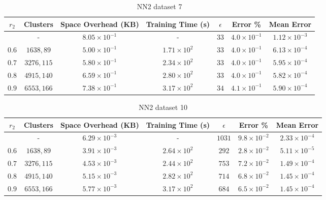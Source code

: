 \begin{adjustwidth}{-1cm}{}
\begin{table}
\caption{NN2 dataset 7}\label{ws27}
\begin{tabular}{ccccccc}
\hline
\toprule
$r_2$ & Clusters & Space Overhead (KB) & Training Time (s) & $\epsilon$ & Error \% & Mean Error\\
\midrule
 & - & $8.05 \times 10^{-1}$ & - & $33$ & $4.0 \times 10^{-1}$ & $1.12 \times 10^{-3}$\\
$0.6$ & $1638, 89$ & $5.00 \times 10^{-1}$ & $1.71 \times 10^2$ & $33$ & $4.0 \times 10^{-1}$ & $6.13 \times 10^{-4}$\\
$0.7$ & $3276, 115$ & $5.80 \times 10^{-1}$ & $2.34 \times 10^2$ & $33$ & $4.0 \times 10^{-1}$ & $5.95 \times 10^{-4}$\\
$0.8$ & $4915, 140$ & $6.59 \times 10^{-1}$ & $2.80 \times 10^2$ & $33$ & $4.0 \times 10^{-1}$ & $5.82 \times 10^{-4}$\\
$0.9$ & $6553, 166$ & $7.38 \times 10^{-1}$ & $3.17 \times 10^2$ & $34$ & $4.1 \times 10^{-1}$ & $5.90 \times 10^{-4}$\\
\bottomrule
\end{tabular}
\end{table}
\end{adjustwidth}

\begin{adjustwidth}{-1cm}{}
\begin{table}
\caption{NN2 dataset 10}\label{ws210}
\begin{tabular}{ccccccc}
\hline
\toprule
$r_2$ & Clusters & Space Overhead (KB) & Training Time (s) & $\epsilon$ & Error \% & Mean Error\\
\midrule
 & - & $6.29 \times 10^{-3}$ & - & $1031$ & $9.8 \times 10^{-2}$ & $2.33 \times 10^{-4}$\\
$0.6$ & $1638, 89$ & $3.91 \times 10^{-3}$ & $2.64 \times 10^2$ & $292$ & $2.8 \times 10^{-2}$ & $5.11 \times 10^{-5}$\\
$0.7$ & $3276, 115$ & $4.53 \times 10^{-3}$ & $2.44 \times 10^2$ & $753$ & $7.2 \times 10^{-2}$ & $1.49 \times 10^{-4}$\\
$0.8$ & $4915, 140$ & $5.15 \times 10^{-3}$ & $2.82 \times 10^2$ & $714$ & $6.8 \times 10^{-2}$ & $1.45 \times 10^{-4}$\\
$0.9$ & $6553, 166$ & $5.77 \times 10^{-3}$ & $3.17 \times 10^2$ & $684$ & $6.5 \times 10^{-2}$ & $1.45 \times 10^{-4}$\\
\bottomrule
\end{tabular}
\end{table}
\end{adjustwidth}

